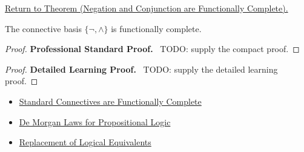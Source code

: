 \newpage
{}
\label{prf:negation-conjunction-functionally-complete-propositional-logic}

\begin{remark*}[Return]
\hyperref[thm:negation-conjunction-functionally-complete-propositional-logic]{Return to Theorem (Negation and Conjunction are Functionally Complete).}
\end{remark*}

\begin{theorem*}
The connective basis \(\{\neg,\land\}\) is functionally complete.
\end{theorem*}

\begin{proof}
\textbf{Professional Standard Proof.}~
TODO: supply the compact proof.
\end{proof}

\begin{proof}
\textbf{Detailed Learning Proof.}~
TODO: supply the detailed learning proof.
\end{proof}

\begin{remark*}
\end{remark*}

\begin{dependencies}
\begin{itemize}
  \item \hyperref[thm:standard-connectives-functionally-complete-propositional-logic]{Standard Connectives are Functionally Complete}
  \item \hyperref[thm:de-morgan-laws-propositional-logic]{De Morgan Laws for Propositional Logic}
  \item \hyperref[thm:replacement-of-logical-equivalents-propositional-logic]{Replacement of Logical Equivalents}
\end{itemize}
\end{dependencies}

\clearpage
